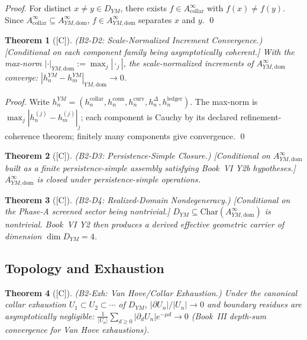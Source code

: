 \documentclass[12pt,oneside]{amsbook}
\theoremstyle{plain}
\newtheorem{theorem}{Theorem}[section]
\theoremstyle{definition}
\theoremstyle{remark}
\newcommand{\status}[1]{\textup{[#1]}}
\begin{document}
\begin{proof}
For distinct $x\neq y\in D_{YM}$, there exists $f\in
A_{\mathrm{collar}}^{\infty}$ with $f(x)\neq f(y)$. Since
$A_{\mathrm{collar}}^{\infty}\subseteq A_{YM,\mathrm{dom}}^{\infty}$,
$f\in A_{YM,\mathrm{dom}}^{\infty}$ separates $x$ and $y$.
\qed
\end{proof}

\begin{theorem}[\status{C}]\label{thm:B2-D2}
\textup{(B2-D2: Scale-Normalized Increment Convergence.)}
\textup{[Conditional on each component family being asymptotically coherent.]}
With the max-norm $|\cdot|_{YM,\mathrm{dom}} := \max_j |\cdot_j|$,
the scale-normalized increments of $A_{YM,\mathrm{dom}}^{\infty}$
converge: $|h_n^{YM} - h_m^{YM}|_{YM,\mathrm{dom}}\to 0$.
\end{theorem}

\begin{proof}
Write $h_n^{YM} = (h_n^{\mathrm{collar}}, h_n^{\mathrm{conn}},
h_n^{\mathrm{curv}}, h_n^{\Delta}, h_n^{\mathrm{ledger}})$. The max-norm is
$\max_j |h_n^{(j)} - h_m^{(j)}|_j$; each component is Cauchy by
its declared refinement-coherence theorem; finitely many components
give convergence.
\qed
\end{proof}

\begin{theorem}[\status{C}]\label{thm:B2-D3}
\textup{(B2-D3: Persistence-Simple Closure.)}
\textup{[Conditional on $A_{YM,\mathrm{dom}}^{\infty}$ built as a finite
persistence-simple assembly satisfying Book~VI Y2b hypotheses.]}
$A_{YM,\mathrm{dom}}^{\infty}$ is closed under persistence-simple
operations.
\end{theorem}

\begin{theorem}[\status{C}]\label{thm:B2-D4}
\textup{(B2-D4: Realized-Domain Nondegeneracy.)}
\textup{[Conditional on the Phase-A screened sector being nontrivial.]}
$D_{YM}\subseteq\mathrm{Char}(A_{YM,\mathrm{dom}}^{\infty})$ is
nontrivial. Book~VI Y2 then produces a derived effective geometric
carrier of dimension $\dim D_{YM} = 4$.
\end{theorem}

\subsection{Topology and Exhaustion}

\begin{theorem}[\status{C}]\label{thm:B2-Exh}
\textup{(B2-Exh: Van Hove/Collar Exhaustion.)}
Under the canonical collar exhaustion $U_1\subset U_2\subset\cdots$
of $D_{YM}$, $|\partial U_n|/|U_n|\to 0$ and boundary residues
are asymptotically negligible:
$\frac{1}{|U_n|}\sum_{d\ge0}|\partial_d U_n|e^{-\mu d}\to 0$
(Book~III depth-sum convergence for Van Hove exhaustions).
\end{theorem}
\end{document}
